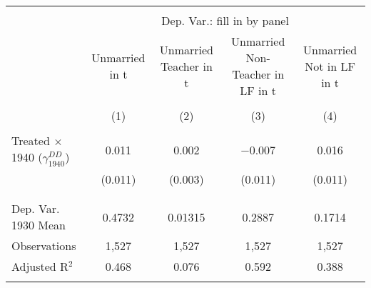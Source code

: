 
\begin{tabular}{@{\extracolsep{5pt}}lcccc} 
\\[-1.8ex]\hline 
\hline \\[-1.8ex] 
 & \multicolumn{4}{c}{Dep. Var.: fill in by panel} \\ 
\cline{2-5} 
 & Unmarried in t & Unmarried Teacher in t & Unmarried Non-Teacher in LF in t & Unmarried Not in LF in t \\ 
\\[-1.8ex] & (1) & (2) & (3) & (4)\\ 
\hline \\[-1.8ex] 
 Treated $\times$ 1940 ($\gamma_{1940}^{DD}$) & 0.011 & 0.002 & $-$0.007 & 0.016 \\ 
  & (0.011) & (0.003) & (0.011) & (0.011) \\ 
  & & & & \\ 
\hline \\[-1.8ex] 
Dep. Var. 1930 Mean & 0.4732 & 0.01315 & 0.2887 & 0.1714 \\ 
Observations & 1,527 & 1,527 & 1,527 & 1,527 \\ 
Adjusted R$^{2}$ & 0.468 & 0.076 & 0.592 & 0.388 \\ 
\hline 
\hline \\[-1.8ex] 
\end{tabular} 
